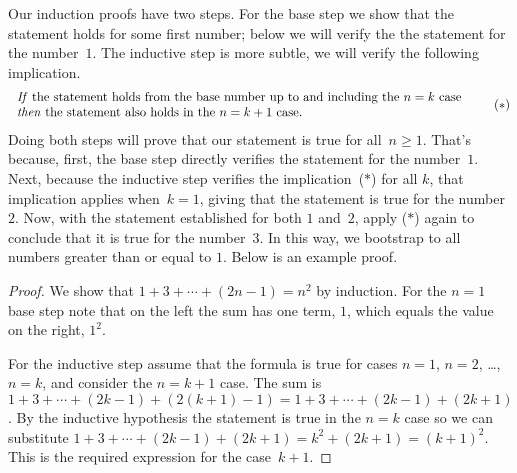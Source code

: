 \documentclass{ibl}
\begin{document}
Our induction proofs have two steps.
For the base step we show that the statement holds for some first number;
below we will verify the the statement for the number~$1$.
The inductive step is more subtle,
we will verify the following implication.
\begin{equation*}
  \begin{tabular}{l} 
  \textit{If} the statement holds from the base number up to and including 
   the $n=k$ case \\
  \textit{then} the statement also holds in the~$n=k+1$ case.
  \end{tabular}
  \tag{$*$}
\end{equation*}
Doing both steps will 
prove that our statement is true for all~$n\geq 1$.
That's because, first, the base step
directly verifies the statement for the number~$1$.
Next, because the inductive step verifies the implication~($*$) for all $k$, 
that implication applies when~$k=1$, giving 
that the statement is true for the number~$2$. 
Now, with the statement established for both $1$ and~$2$, 
apply ($*$) again to conclude that it is true for the number~$3$.
In this way, we bootstrap to all numbers greater than or equal to $1$.
Below is an example proof.

\begin{proof}
  We show that $1+3+\cdots+(2n-1)=n^2$ by induction.
  For the $n=1$ base step note that on the left the sum has one term, $1$,
  which equals the value on the right, $1^2$.

  For the inductive step assume that the 
  formula is true for cases $n=1$, $n=2$, \ldots, $n=k$, and 
  consider the $n=k+1$ case.
  The sum is $1+3+\cdots+(2k-1)+(2(k+1)-1)=1+3+\cdots+(2k-1)+(2k+1)$.
  By the inductive hypothesis the statement is true in the $n=k$ case
  so we can substitute 
  $1+3+\cdots+(2k-1)+(2k+1)=k^2+(2k+1)=(k+1)^2$.
  This is the required expression for the case~$k+1$.
\end{proof}
\end{document}

